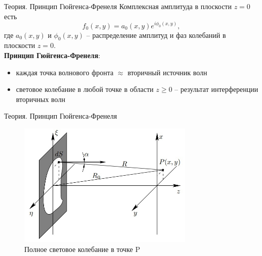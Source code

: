\documentclass[11pt]{beamer} %
\begin{document}
    \begin{frame}{Теория. Принцип Гюйгенса-Френеля}
        Комплексная амплитуда в плоскости $z=0$ есть
        \begin{equation}
            f_0(x,y) = a_0(x,y)e^{i\phi_0(x,y)},
        \end{equation}
        где $a_0(x,y)$ и $\phi_0(x,y)$ -- распределение амплитуд и фаз колебаний в плоскости $z=0$.\\
        \textbf{Принцип Гюйгенса-Френеля}: 
        \begin{itemize}
            \item каждая точка волнового фронта $\approx$ вторичный источник волн
            \item световое колебание в любой точке в области $z\ge0$ -- результат интерференции вторичных волн 
        \end{itemize}
    \end{frame}

    \begin{frame}{Теория. Принцип Гюйгенса-Френеля}
        \begin{figure}
                \includegraphics[width = 0.75\textwidth]{images/theory_huygens_frenel.jpg}
                \caption{Полное световое колебание в точке P}
            \end{figure}
    \end{frame}
\end{document}
